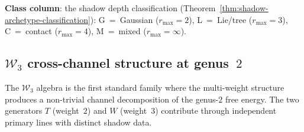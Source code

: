 \medskip\noindent
\textbf{Class column}: the shadow depth classification
(Theorem~\ref{thm:shadow-archetype-classification}):
G~=~Gaussian ($r_{\max} = 2$),
L~=~Lie/tree ($r_{\max} = 3$),
C~=~contact ($r_{\max} = 4$),
M~=~mixed ($r_{\max} = \infty$).

\subsection{\texorpdfstring{$\mathcal{W}_3$}{W3} cross-channel
structure at genus~\texorpdfstring{$2$}{2}}
\label{subsec:w3-cross-channel-genus2}

The $\mathcal{W}_3$ algebra is the first standard family where the
multi-weight structure produces a non-trivial channel decomposition
of the genus-$2$ free energy. The two generators $T$ (weight~$2$)
and $W$ (weight~$3$) contribute through independent primary lines
with distinct shadow data.

